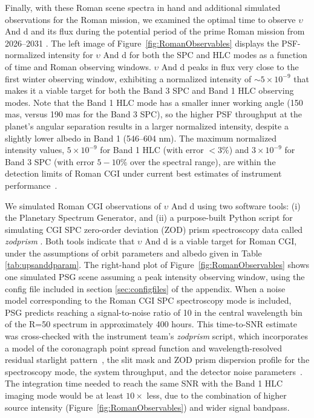 \documentclass[12pt, letterpaper]{aastex631}
\begin{document}
Finally, with these Roman scene spectra in hand and additional simulated observations for the Roman mission, we examined the optimal time to observe $\upsilon$ And d and its flux during the potential period of the prime Roman mission from 2026--2031 \citep{2019arXiv190205569A}.  The left image of Figure~\ref{fig:RomanObservables} displays the PSF-normalized intensity for $\upsilon$ And d for both the SPC and HLC modes as a function of time and Roman observing windows. $\upsilon$ And d peaks in flux very close to the first winter observing window, exhibiting a normalized intensity of $\sim5\times10^{-9}$ that makes it a viable target for both the Band 3 SPC and Band 1 HLC observing modes. Note that the Band 1 HLC mode has a smaller inner working angle (150 mas, versus 190 mas for the Band 3 SPC), so the higher PSF throughput at the planet's angular separation results in a larger normalized intensity, despite a slightly lower albedo in Band 1 (546--604 nm). The maximum normalized intensity values, $5\times10^{-9}$ for Band 1 HLC (with error $<3\%$) and $3\times10^{-9}$ for Band 3 SPC (with error $5-10\%$ over the spectral range), are within the detection limits of Roman CGI under current best estimates of instrument performance~\citep{2019arXiv190104050B}.
 
We simulated Roman CGI observations of $\upsilon$ And d using two software tools: (i) the Planetary Spectrum Generator, and (ii) a purpose-built Python script for simulating CGI SPC zero-order deviation (ZOD) prism spectroscopy data called \textit{zodprism} \citep{10.1117/12.2562925, 10.1117/12.2563480}. Both tools indicate that $\upsilon$ And d is a viable target for Roman CGI, under the assumptions of orbit parameters and albedo given in Table \ref{tab:upsanddparam}. The right-hand plot of Figure~\ref{fig:RomanObservables} shows one simulated PSG scene assuming a peak intensity observing window, using the config file included in section \ref{sec:configfiles} of the appendix. When a noise model corresponding to the Roman CGI SPC spectroscopy mode is included, PSG predicts reaching a signal-to-noise ratio of 10 in the central wavelength bin of the R=50 spectrum in approximately 400 hours. This time-to-SNR estimate was cross-checked with the instrument team's \textit{zodprism} script, which incorporates a model of the coronagraph point spread function and wavelength-resolved residual starlight pattern~\citep{Krist2016JATIS}, the slit mask and ZOD prism dispersion profile for the spectroscopy mode, the system throughput, and the detector noise parameters~\citep{Groff2020AAS}. The integration time needed to reach the same SNR with the Band 1 HLC imaging mode would be at least $10\times$ less, due to the combination of higher source intensity (Figure~\ref{fig:RomanObservables}) and wider signal bandpass.
\end{document}
